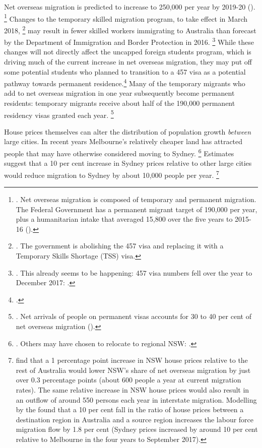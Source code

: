 Net overseas migration is predicted to increase to 250,000 per year by 2019-20 ().%
	\footnote{\textcite{DIBP2016}. Net overseas migration is composed of temporary and permanent migration. The Federal Government has a permanent migrant target of 190,000 per year, plus a humanitarian intake that averaged 15,800 over the five years to 2015-16
	(\textcite{Phillips-2017-Aust-humanitarian-program-guide-to-the-stats}).}
Changes to the temporary skilled migration program, to take effect in March 2018,%
    \footnote{\textcite{DIBP2017457changes}. The government is abolishing the 457 visa and replacing it with a  Temporary Skills Shortage (TSS) visa.}
may result in fewer skilled workers immigrating to Australia than forecast by the Department of Immigration and Border Protection in 2016.%
    \footnote{\textcites{Sherrell20184_57changes}{Birrell457changes}. 
    This already seems to be happening: 457 visa numbers fell over the year to December 2017: \textcite{457_datagovau_2018}.}
While these changes will not directly affect the uncapped foreign students program, which is driving much of the current increase in net overseas migration, they may put off some potential students who planned to transition to a 457 visa as a potential pathway towards permanent residence.\footcite{Pascoe_2018_smh_457_student_visas}
Many of the temporary migrants who add to net overseas migration in one year subsequently become permanent residents: temporary migrants receive about half of the 190,000 permanent residency visas granted each year.%
	\footnote{\textcite[][19]{DIBP-2016-Australias-migration-trends-1415}. Net arrivals of people on permanent visas accounts for 30 to 40 per cent of net overseas migration ().}


House prices themselves can alter the distribution of population growth \emph{between} large cities. In recent years Melbourne's relatively cheaper land has attracted people that may have otherwise considered moving to Sydney.%
    \footnote{\textcite{RBACarrFernandesRosewall}. 
    Others may have chosen to relocate to regional NSW: \textcite{Hanna_2018_smh_sydney_migration}.}
Estimates suggest that a 10 per cent increase in Sydney prices relative to other large cities would reduce migration to Sydney by about 10,000 people per year.%
	\footnote{\textcite[][13]{NSW-Treasury-Housing-Prices-and-Migration-Flows}
	find that a 1 percentage point increase in NSW house prices relative to the rest of Australia would lower NSW's share of net overseas migration by just over 0.3 percentage points (about 600 people a year at current migration rates).
	The same relative increase in NSW house prices would also result in an outflow of around 550 persons each year in interstate migration. Modelling by the \textcite{GeographicLabourMobility} found that a 10 per cent fall in the ratio of house prices between a destination region in Australia and a source region increases the labour force migration flow by 1.8 per cent (Sydney prices increased by around 10 per cent relative to Melbourne in the four years to September 2017).}


